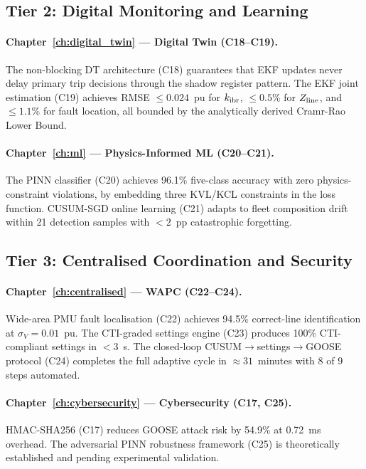 \subsection{Tier 2: Digital Monitoring and Learning}

\paragraph{Chapter~\ref{ch:digital_twin} --- Digital Twin (C18--C19).}
The non-blocking DT architecture (C18) guarantees that EKF updates never
delay primary trip decisions through the shadow register pattern. The
EKF joint estimation (C19) achieves RMSE $\leq 0.024$~pu for $k_\mathrm{ibr}$,
$\leq 0.5\%$ for $Z_\mathrm{line}$, and $\leq 1.1\%$ for fault location, all
bounded by the analytically derived Cramr-Rao Lower Bound.

\paragraph{Chapter~\ref{ch:ml} --- Physics-Informed ML (C20--C21).}
The PINN classifier (C20) achieves 96.1\% five-class accuracy with zero
physics-constraint violations, by embedding three KVL/KCL constraints
in the loss function. CUSUM-SGD online learning (C21) adapts to fleet
composition drift within 21 detection samples with $< 2$~pp catastrophic
forgetting.

\subsection{Tier 3: Centralised Coordination and Security}

\paragraph{Chapter~\ref{ch:centralised} --- WAPC (C22--C24).}
Wide-area PMU fault localisation (C22) achieves 94.5\% correct-line
identification at $\sigma_V = 0.01$~pu. The CTI-graded settings engine
(C23) produces 100\% CTI-compliant settings in $< 3$~s. The closed-loop
CUSUM$\to$settings$\to$GOOSE protocol (C24) completes the full adaptive
cycle in $\approx 31$~minutes with 8 of 9 steps automated.

\paragraph{Chapter~\ref{ch:cybersecurity} --- Cybersecurity (C17, C25).}
HMAC-SHA256 (C17) reduces GOOSE attack risk by 54.9\% at 0.72~ms overhead.
The adversarial PINN robustness framework (C25) is theoretically established
and pending experimental validation.

